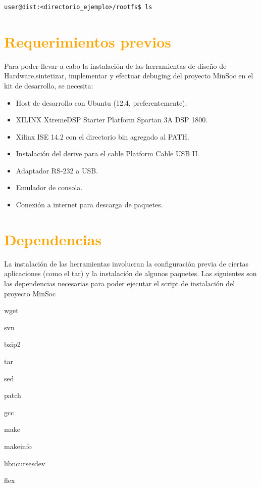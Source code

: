 \begin{lstlisting}[breaklines]
user@dist:<directorio_ejemplo>/rootfs$ ls
\end{lstlisting}

\section{\textcolor{orange}{Requerimientos previos}}

 Para poder llevar a cabo la instalación de las herramientas de diseño de Hardware,sintetizar, implementar y efectuar debuging  del proyecto MinSoc en el kit de desarrollo, se necesita:

\begin{itemize}
\item Host de desarrollo con Ubuntu (12.4, preferentemente).
\item XILINX XtremeDSP Starter Platform Spartan 3A DSP 1800.
\item Xilinx ISE 14.2 con el directorio bin agregado al PATH.
\item Instalación del derive para el cable Platform Cable USB II.
\item Adaptador RS-232 a USB.
\item Emulador de consola.
\item Conexión a internet para descarga de paquetes.

\end{itemize} 

\newpage

\section{\textcolor{orange}{Dependencias}}

La instalación de las herramientas involucran la configuración previa de ciertas aplicaciones (como el tar) y la instalación de algunos paquetes.
Las siguientes son las dependencias necesarias para poder ejecutar el script de instalación del proyecto MinSoc

wget

svn

bzip2

tar

sed

patch

gcc

make

makeinfo

libncurses\-dev

flex

